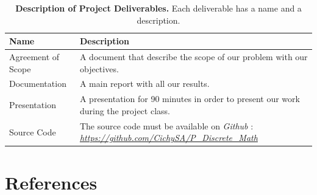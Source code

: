 \documentclass[12pt, openany]{article}
\begin{document}
\begin{table}[H]
    \centering
    \renewcommand{\arraystretch}{1.5}
    \begin{tabularx}{\textwidth}{|l|X|}
        \hline 
        \textbf{Name} & \textbf{Description} \\ \hline

        Agreement of Scope & A document that describe the scope of our problem with our objectives. \\ \hdashline

        Documentation & A main report with all our results. \\ \hdashline

        Presentation & A presentation for 90 minutes in order to present our work during the project class.\\ \hdashline

        Source Code & The source code must be available on \textit{Github} : \href{https://github.com/CichySA/P\_Discrete\_Math}{\textit{https://github.com/CichySA/P\_Discrete\_Math}} \\ 

        \hline
    \end{tabularx}
    \caption{\textbf{Description of Project Deliverables.} Each deliverable has a name and a description.}
    \label{tab:SSP_PD}
\end{table}

\section*{References}
\printbibliography[sorting=nyt, heading=none]
\end{document}
